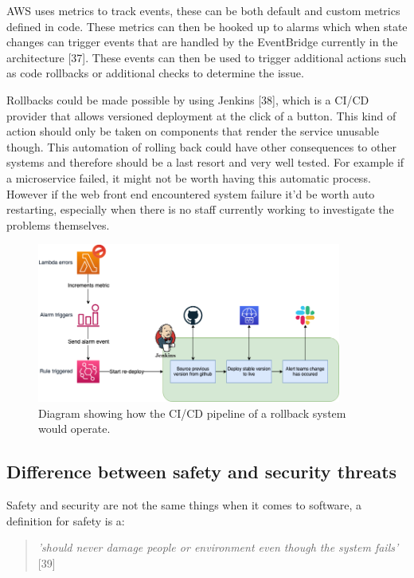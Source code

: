   AWS uses metrics to track events, these can be both default and custom metrics defined in code. These metrics can then be hooked up to alarms which 
  when state changes can trigger events that are handled by the EventBridge currently in the architecture [37]. These events can then be used to trigger
  additional actions such as code rollbacks or additional checks to determine the issue.

  Rollbacks could be made possible by using Jenkins [38], which is a CI/CD provider that allows versioned deployment at the click of a button. This kind 
  of action should only be taken on components that render the service unusable though. This automation of rolling back could have other consequences to 
  other systems and therefore should be a last resort and very well tested. For example if a microservice failed, it might not be worth having this automatic
  process. However if the web front end encountered system failure it'd be worth auto restarting, especially when there is no staff currently working to 
  investigate the problems themselves.
  
  \begin{figure}[H]
    \centering
    \includegraphics[width=10cm]{assets/rollbackPipeline.drawio.png}
    \caption{Diagram showing how the CI/CD pipeline of a rollback system would operate.}
    \label{fig:rollbackPipeline}
  \end{figure}
  
  \subsection{Difference between safety and security threats}

  Safety and security are not the same things when it comes to software, a definition for safety is a:
  \begin{quote}
    \textit{'should never damage people or environment even though the system fails'} [39]
  \end{quote}

